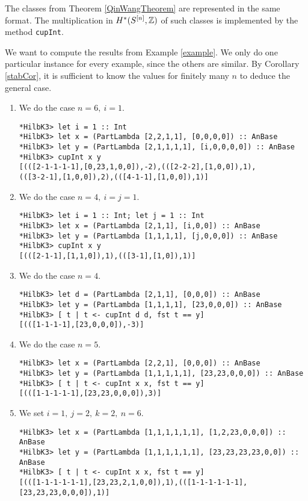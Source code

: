 The classes from Theorem \ref{QinWangTheorem} are represented in the same format. The multiplication in $H^*(S^{[n]},\mathbb{Z})$ of such classes is implemented by the method \verb|cupInt|.
\begin{example}\label{exampleSource} We want to compute the results from Example \ref{example}. We only do one particular instance for every example, since the others are similar. By Corollary \ref{stabCor}, it is sufficient to know the values for finitely many $n$ to deduce the general case.
\begin{enumerate}
\item We do the case $n=6,\ i=1$. 
\begin{Verbatim}[fontsize=\small]
*HilbK3> let i = 1 :: Int
*HilbK3> let x = (PartLambda [2,2,1,1], [0,0,0,0]) :: AnBase
*HilbK3> let y = (PartLambda [2,1,1,1,1], [i,0,0,0,0]) :: AnBase
*HilbK3> cupInt x y
[(([2-1-1-1-1],[0,23,1,0,0]),-2),(([2-2-2],[1,0,0]),1),
(([3-2-1],[1,0,0]),2),(([4-1-1],[1,0,0]),1)]
\end{Verbatim}
\item We do the case $n=4,\ i=j=1$. 
\begin{Verbatim}[fontsize=\small]
*HilbK3> let i = 1 :: Int; let j = 1 :: Int
*HilbK3> let x = (PartLambda [2,1,1], [i,0,0]) :: AnBase
*HilbK3> let y = (PartLambda [1,1,1,1], [j,0,0,0]) :: AnBase
*HilbK3> cupInt x y
[(([2-1-1],[1,1,0]),1),(([3-1],[1,0]),1)]
\end{Verbatim}
\item We do the case $n=4$. 
\begin{Verbatim}[fontsize=\small]
*HilbK3> let d = (PartLambda [2,1,1], [0,0,0]) :: AnBase
*HilbK3> let y = (PartLambda [1,1,1,1], [23,0,0,0]) :: AnBase
*HilbK3> [ t | t <- cupInt d d, fst t == y]
[(([1-1-1-1],[23,0,0,0]),-3)]
\end{Verbatim}
\item We do the case $n=5$. 
\begin{Verbatim}[fontsize=\small]
*HilbK3> let x = (PartLambda [2,2,1], [0,0,0]) :: AnBase
*HilbK3> let y = (PartLambda [1,1,1,1,1], [23,23,0,0,0]) :: AnBase
*HilbK3> [ t | t <- cupInt x x, fst t == y]
[(([1-1-1-1-1],[23,23,0,0,0]),3)]
\end{Verbatim}
\item We set $i=1,\ j= 2,\ k=2, \ n=6$.
\begin{Verbatim}[fontsize=\small]
*HilbK3> let x = (PartLambda [1,1,1,1,1,1], [1,2,23,0,0,0]) :: AnBase
*HilbK3> let y = (PartLambda [1,1,1,1,1,1], [23,23,23,23,0,0]) :: AnBase
*HilbK3> [ t | t <- cupInt x x, fst t == y]
[(([1-1-1-1-1-1],[23,23,2,1,0,0]),1),(([1-1-1-1-1-1],[23,23,23,0,0,0]),1)]
\end{Verbatim}
\end{enumerate}
\end{example}

